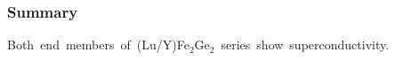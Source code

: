 

\begin{frame}[plain]
\frametitle{Summary}
  \mbox{Both end members of (Lu/Y)Fe$_2$Ge$_2$ series show superconductivity.}
\end{frame}


